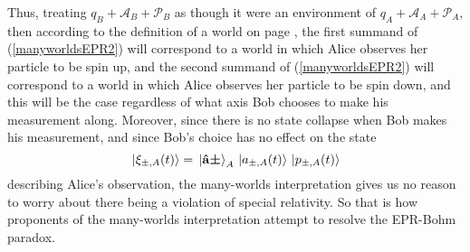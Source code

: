 Thus, treating $q_B+\mathcal{A}_B+\mathcal{P}_B$ as though it were an environment of $q_A+\mathcal{A}_A+\mathcal{P}_A$, then according to the definition of a world on page \pageref{rigorousworld}, the first summand of (\ref{manyworldsEPR2}) will correspond to a world in which Alice observes her particle to be spin up, and the second summand of (\ref{manyworldsEPR2}) will correspond to a world in which Alice observes her particle to be spin down, and this will be the case regardless of what axis Bob chooses to make his measurement along. Moreover, since there is no state collapse when Bob makes his measurement, and since Bob's choice has no effect on the state 
\begin{equation*}
\ket*{\xi_{\pm,A}(t)}=\ket*{{\vb{\hat{{a}}}\bm{\pm}}}_A\ket*{a_{\pm,A}(t)}\ket*{p_{\pm, A}(t)}
\end{equation*}
describing Alice's observation, the many-worlds interpretation gives us no reason to worry about there being a violation of special relativity. So that is how proponents of the many-worlds interpretation attempt to resolve the EPR-Bohm paradox.



